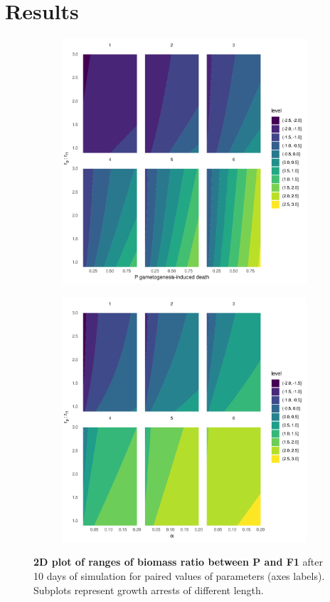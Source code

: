 \documentclass[a4paper,oneside]{book}
\begin{document}
  \section*{Results}
    \begin{figure}[h]
      \centering
      \begin{subfigure}{0.45\textwidth}
        \includegraphics[width=\linewidth]{imgs/a.pdf}
      \end{subfigure}
      \begin{subfigure}{0.45\textwidth}
        \includegraphics[width=\linewidth]{imgs/b.pdf}
      \end{subfigure}
      \caption{\textbf{2D plot of ranges of biomass ratio between P and F1} after 10 days of simulation for paired values of parameters (axes labels). Subplots represent growth arrests of different length.}\label{swep}
    \end{figure}
\end{document}
